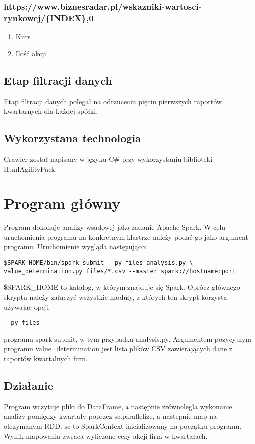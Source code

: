\subsubsection{https://www.biznesradar.pl/wskazniki-wartosci-rynkowej/\{INDEX\},0}
\begin{enumerate}
	\item Kurs
	\item Ilość akcji
\end{enumerate}

\subsection{Etap filtracji danych}
Etap filtracji danych polegał na odrzuceniu pięciu pierwszych raportów kwartarnych dla każdej spółki.

\subsection{Wykorzystana technologia}
Crawler został napisany w języku C\# przy wykorzystaniu biblioteki HtmlAgilityPack.
\section{Program główny}
Program dokonuje analizy wsadowej jako zadanie Apache Spark.
W celu uruchomienia programu na konkretnym klastrze należy podać go jako argument programu.
Uruchomienie wygląda następująco:
\begin{verbatim}
$SPARK_HOME/bin/spark-submit --py-files analysis.py \
value_determination.py files/*.csv --master spark://hostname:port
\end{verbatim}
\$SPARK\_HOME to katalog, w którym znajduje się Spark.
Oprócz głównego skryptu należy załączyć wszystkie moduły, z których ten skrypt korzysta używając
opcji
\begin{verbatim}
--py-files
\end{verbatim}
programu spark-submit, w tym przypadku analysis.py.
Argumentem pozycyjnym programu value\_determination jest lista plików CSV zawierających dane z raportów
kwartalnych firm.
\subsection{Działanie}
Program wczytuje pliki do DataFrame, a następnie zrównolegla wykonanie analizy pomiędzy kwartały
poprzez sc.parallelize, a następnie map na otrzymanym RDD.
sc to SparkContext inicializowany na początku programu.
Wynik mapowania zwraca wyliczone ceny akcji firm w kwartałach.
